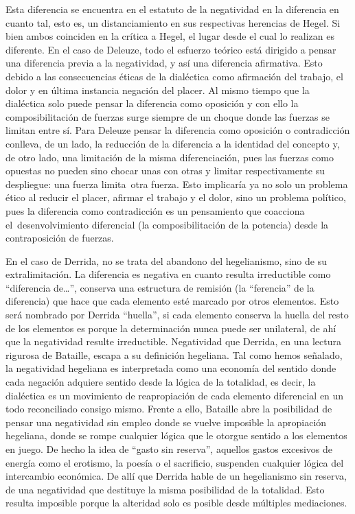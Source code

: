 Esta diferencia se encuentra en el estatuto de la negatividad en la diferencia en cuanto tal, esto es, un distanciamiento en sus respectivas herencias de Hegel. Si bien ambos coinciden en la crítica a Hegel, el lugar desde el cual lo realizan es diferente. En el caso de Deleuze, todo el esfuerzo teórico está dirigido a pensar una diferencia previa a la negatividad, y así una diferencia afirmativa. Esto debido a las consecuencias éticas de la dialéctica como afirmación del trabajo, el dolor y en última instancia negación del placer. Al mismo tiempo que la dialéctica solo puede pensar la diferencia como oposición y con ello la composibilitación de fuerzas surge siempre de un choque donde las fuerzas se limitan entre sí. Para Deleuze pensar la diferencia como oposición o contradicción conlleva, de un lado, la reducción de la diferencia a la identidad del concepto y, de otro lado, una limitación de la misma diferenciación, pues las fuerzas como opuestas no pueden sino chocar unas con otras y limitar respectivamente su despliegue: una fuerza limita~otra fuerza. Esto implicaría ya no solo un problema ético al reducir el placer, afirmar el trabajo y el dolor, sino un problema político, pues la diferencia como contradicción es un pensamiento que coacciona el~desenvolvimiento diferencial (la composibilitación de la potencia) desde la contraposición de fuerzas.

En el caso de Derrida, no se trata del abandono del hegelianismo, sino de su extralimitación. La diferencia es negativa en cuanto resulta irreductible como \enquote{diferencia de\ldots}, conserva una estructura de remisión (la \enquote{ferencia} de la diferencia) que hace que cada elemento esté marcado por otros elementos. Esto será nombrado por Derrida \enquote{huella}, si cada elemento conserva la huella del resto de los elementos es porque la determinación nunca puede ser unilateral, de ahí que la negatividad resulte irreductible. Negatividad que Derrida, en una lectura rigurosa de Bataille, escapa a su definición hegeliana. Tal como hemos señalado, la negatividad hegeliana es interpretada como una economía del sentido donde cada negación adquiere sentido desde la lógica de la totalidad, es decir, la dialéctica es un movimiento de reapropiación de cada elemento diferencial en un todo reconciliado consigo mismo. Frente a ello, Bataille abre la posibilidad de pensar una negatividad sin empleo donde se vuelve imposible la apropiación hegeliana, donde se rompe cualquier lógica que le otorgue sentido a los elementos en juego. De hecho la idea de \enquote{gasto sin reserva}, aquellos gastos excesivos de energía como el erotismo, la poesía o el sacrificio, suspenden cualquier lógica del intercambio económica. De allí que Derrida hable de un hegelianismo sin reserva, de una negatividad que destituye la misma posibilidad de la totalidad. Esto resulta imposible porque la alteridad solo es posible desde múltiples mediaciones.

